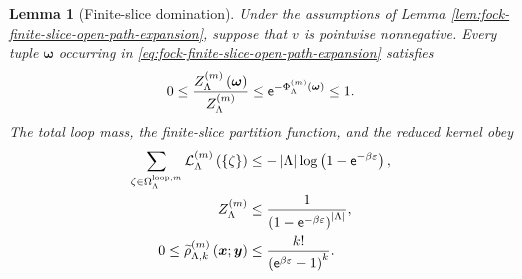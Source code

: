 \documentclass[11pt,a4paper]{article}
\theoremstyle{plain}
\newtheorem{lem}[thm]{Lemma}
\theoremstyle{definition}
\theoremstyle{remark}
\begin{document}
\begin{lem}[Finite-slice domination]\label{lem:fock-finite-slice-domination}
Under the assumptions of Lemma \ref{lem:fock-finite-slice-open-path-expansion}, suppose that $v$ is pointwise
nonnegative.
Every tuple $\boldsymbol{\omega}$ occurring in \eqref{eq:fock-finite-slice-open-path-expansion} satisfies
\begin{equation}
\begin{aligned}
0
\leq
\frac{Z_{\Lambda}^{(m)} \left( \boldsymbol{\omega} \right)}{Z_{\Lambda}^{(m)}}
\leq
\mathsf{e}^{-\Phi_{\Lambda}^{(m)} \left( \boldsymbol{\omega} \right)}
\leq
1.
\end{aligned}
\label{eq:fock-finite-slice-normalized-loop-bound}
\end{equation}
The total loop mass, the finite-slice partition function, and the reduced kernel obey
\begin{equation}
\begin{aligned}
\sum_{\zeta\in\Omega_{\Lambda}^{\mathrm{loop},m}}
\mathcal{L}_{\Lambda}^{(m)} \left( \left\{ \zeta \right\} \right)
& \leq
-\left| \Lambda \right|
\log\left( 1-\mathsf{e}^{-\beta\varepsilon} \right),
\\
Z_{\Lambda}^{(m)}
& \leq
\frac{1}{\left( 1-\mathsf{e}^{-\beta\varepsilon} \right)^{\left| \Lambda \right|}},
\\
0
\leq
\widetilde{\rho}_{\Lambda,k}^{(m)} \left( \boldsymbol{x};\boldsymbol{y} \right)
& \leq
\frac{k!}{\left( \mathsf{e}^{\beta\varepsilon}-1 \right)^{k}}.
\end{aligned}
\label{eq:fock-finite-slice-uniform-bounds}
\end{equation}
\end{lem}
\end{document}

